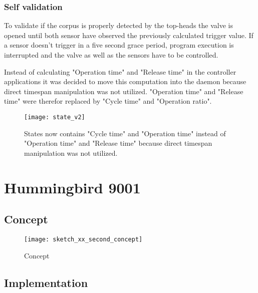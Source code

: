 \subsubsection{Self validation}
To validate if the corpus is properly detected by the top-heads the valve is opened until both sensor have observed the previously calculated trigger value. If a sensor doesn't trigger in a five second grace period, program execution is interrupted and the valve as well as the sensors have to be controlled.




Instead of calculating "Operation time" and "Release time" in the controller applications it was decided to move this computation into the daemon because direct timespan manipulation was not utilized. "Operation time" and "Release time" were therefor replaced by "Cycle time" and "Operation ratio".

\begin{figure}[h]
\centering

\texttt{[image: state\_v2]}

\caption{States now contains "Cycle time" and "Operation time" instead of "Operation time" and "Release time" because direct timespan manipulation was not utilized.}
\end{figure}

\section{Hummingbird 9001}

\subsection{Concept}



\begin{figure}[h]
\centering

\texttt{[image: sketch\_xx\_second\_concept]}

\caption{Concept}
\end{figure}

\subsection{Implementation}